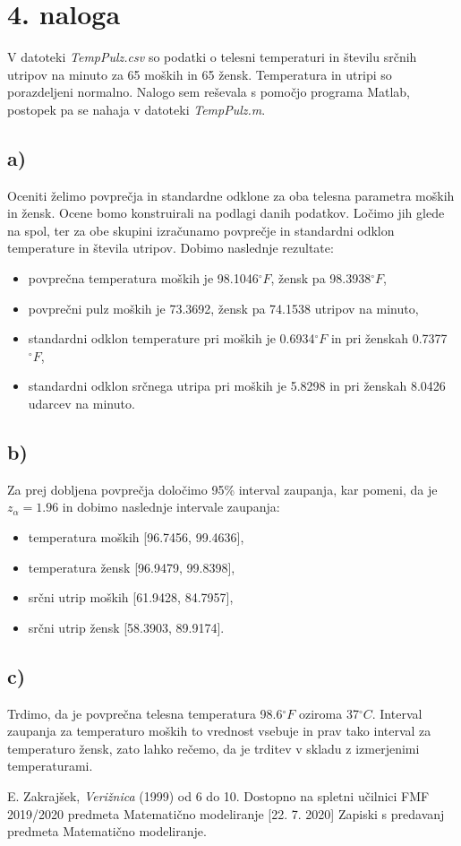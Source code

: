 \documentclass[A4paper, 11pt]{article}
\begin{document}

\section*{4. naloga}

V datoteki \textit{TempPulz.csv} so podatki o telesni temperaturi in številu srčnih utripov na minuto za 65 moških in 65 žensk. Temperatura in utripi so porazdeljeni normalno. Nalogo sem reševala s pomočjo programa Matlab, postopek pa se nahaja v datoteki \textit{TempPulz.m}.

\subsection*{a)}
Oceniti želimo povprečja in standardne odklone za oba telesna parametra moških in žensk. Ocene bomo konstruirali na podlagi danih podatkov. Ločimo jih glede na spol, ter za obe skupini izračunamo povprečje in standardni odklon temperature in števila utripov.
Dobimo naslednje rezultate:
\begin{itemize}
\item povprečna temperatura moških je 98.1046$^{\circ}F$, žensk pa 98.3938$^{\circ}F$,
\item povprečni pulz moških je 73.3692, žensk pa 74.1538 utripov na minuto,
\item standardni odklon temperature pri moških je 0.6934$^{\circ}F$ in pri ženskah 0.7377$^{\circ}F$,
\item standardni odklon srčnega utripa pri moških je 5.8298 in pri ženskah 8.0426 udarcev na minuto. 
\end{itemize}

\subsection*{b)}
Za prej dobljena povprečja določimo 95\% interval zaupanja, kar pomeni, da je $z_\alpha = 1.96$ in dobimo naslednje intervale zaupanja:
\begin{itemize}
\item temperatura moških [96.7456, 99.4636],
\item temperatura žensk [96.9479, 99.8398],
\item srčni utrip moških [61.9428, 84.7957],
\item srčni utrip žensk [58.3903, 89.9174].
\end{itemize}

\subsection*{c)}
Trdimo, da je povprečna telesna temperatura 98.6$^{\circ}F$ oziroma 37$^{\circ}C$. Interval zaupanja za temperaturo moških to vrednost vsebuje in prav tako interval za temperaturo žensk, zato lahko rečemo, da je trditev v skladu z izmerjenimi temperaturami.



\begin{thebibliography}{9}
	E. Zakrajšek, \emph{Verižnica} (1999) od 6 do 10.
	Dostopno na spletni učilnici FMF 2019/2020 predmeta Matematično modeliranje [22. 7. 2020]
	Zapiski s predavanj predmeta Matematično modeliranje.
\end{thebibliography}
\end{document}
